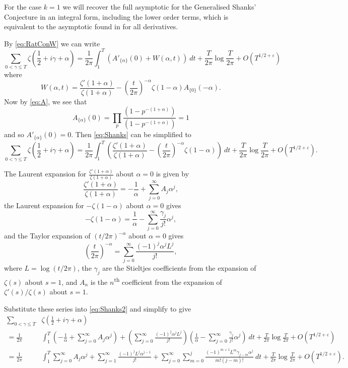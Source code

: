 \documentclass[12pt,a4paper,reqno]{amsart}
\theoremstyle{remark}
\numberwithin{equation}{section}
\begin{document}
For the case $k=1$ we will recover the full asymptotic for the Generalised Shanks' Conjecture in an integral form, including the lower order terms, which is equivalent to the asymptotic found in \cite{HugPC22} for all derivatives.

By \eqref{eq:RatConW} we can write
\begin{equation}\label{eq:Shanks}
\sum_{0 < \gamma \leq T}  \zeta \left(\frac{1}{2} + i \gamma + \alpha \right) = \frac{1}{2 \pi} \int_{1}^{T} \left( A'_{\{\alpha\}}(0) +W(\alpha,t) \right) \ dt + \frac{T}{2\pi} \log\frac{T}{2\pi} + O\left(T^{1/2 +\varepsilon}\right)
\end{equation}
where
\[
W(\alpha,t) = \frac{\zeta'(1+\alpha)}{\zeta(1+\alpha)}  - \left(\frac{t}{2 \pi} \right)^{-\alpha} \zeta(1-\alpha) A_{\{0\}}(-\alpha).
\]
Now by \eqref{eq:A}, we see that
\[
A_{\{\alpha\}}(0)= \prod_p \frac{(1-p^{-(1+\alpha)})}{(1-p^{-(1+\alpha)})} = 1
\]
and so $ A'_{\{\alpha\}}(0)=0$. Then \eqref{eq:Shanks} can be simplified to
\begin{equation}\label{eq:Shanks2}
    \sum_{0 < \gamma \leq T}  \zeta \left(\frac{1}{2} + i \gamma + \alpha \right) = \frac{1}{2 \pi} \int_{1}^{T} \left( \frac{\zeta'(1+\alpha)}{\zeta(1+\alpha)}  - \left(\frac{t}{2 \pi} \right)^{-\alpha} \zeta(1-\alpha) \right) \  dt + \frac{T}{2\pi} \log\frac{T}{2\pi} + O\left(T^{1/2 +\varepsilon}\right).
\end{equation}

The Laurent expansion for $\frac{\zeta' (1+\alpha)}{\zeta (1+\alpha)}$ about $\alpha = 0$ is given by
\[
\frac{\zeta' (1+\alpha)}{\zeta (1+\alpha)} = - \frac{1}{\alpha} + \sum_{j=0}^{\infty} A_j \alpha^j,
\]
the Laurent expansion for $-\zeta (1-\alpha)$ about $\alpha=0$ gives
\[
- \zeta (1-\alpha) = \frac{1}{\alpha} - \sum_{j=0}^{\infty} \frac{\gamma_j}{j!} \alpha^j,
\]
and the Taylor expansion of $(t/2 \pi)^{-\alpha}$ about $\alpha=0$ gives
\[
\left( \frac{t}{2 \pi} \right)^{-\alpha} = \sum_{j=0}^{\infty} \frac{(-1)^j \alpha^j L^j}{j!},
\]
where $L=\log (t/2\pi)$, the $\gamma_j$ are the Stieltjes coefficients from the expansion of $\zeta (s)$ about $s=1$, and $A_n$ is the $n$\textsuperscript{th} coefficient from the expansion of $\zeta '(s)/\zeta (s)$ about $s=1$.

Substitute these series into \eqref{eq:Shanks2} and simplify to give
\begin{align*}
    \sum_{0 < \gamma \leq T}&  \zeta \left(\frac{1}{2} + i \gamma + \alpha \right) \\
    =\frac{1}{2 \pi}& \int_{1}^{T} \left( - \frac{1}{\alpha} + \sum_{j=0}^{\infty} A_j \alpha^j \right) + \left( \sum_{j=0}^{\infty} \frac{(-1)^j \alpha^j L^j}{j!} \right) \left( \frac{1}{\alpha} - \sum_{j=0}^{\infty} \frac{\gamma_j}{j!} \alpha^j \right)  \ dt + \frac{T}{2\pi} \log\frac{T}{2\pi} + O\left(T^{1/2 +\varepsilon}\right) \\
    =\frac{1}{2 \pi}& \int_{1}^{T} \sum_{j=0}^{\infty} A_j \alpha^j + \sum_{j=1}^{\infty} \frac{(-1)^j L^j \alpha^{j-1}}{j!} + \sum_{j=0}^{\infty} \sum_{m=0}^{j} \frac{(-1)^{m+1} L^m \gamma_{j-m} \alpha^j}{m! (j-m)!} \ dt + \frac{T}{2\pi} \log\frac{T}{2\pi} + O\left(T^{1/2 +\varepsilon}\right).
\end{align*}
\end{document}
